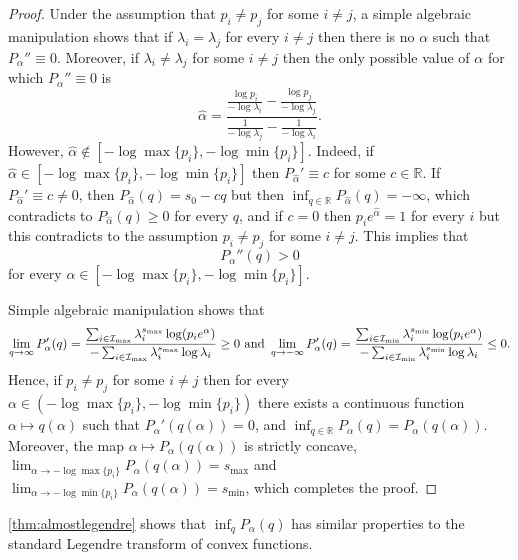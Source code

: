 \documentclass[12pt,]{article}
\theoremstyle{definition}
\theoremstyle{remark}
\renewcommand{\Bbb}[1]{\mathbb{#1}}
\newcommand{\bbR}{{\Bbb R}}        %
\newcommand{\cI}{{\cal I}}
\newcommand{\0}{\mathbf{0}}
\begin{document}
\begin{proof}
  Under the assumption that $p_i\neq p_j$ for some $i\neq j$, a simple algebraic manipulation shows
  that if $\lambda_i=\lambda_j$ for every $i\neq j$ then there is no $\alpha$ such that
  $P_\alpha''\equiv0$. Moreover, if  $\lambda_i\neq\lambda_j$ for some $i\neq j$ then the only
  possible value of $\alpha$ for which $P_\alpha''\equiv0$ is
  $$
  \widehat{\alpha}=\frac{\tfrac{\log p_i}{-\log\lambda_i}-\tfrac{\log
  p_j}{-\log\lambda_j}}{\tfrac{1}{-\log\lambda_j}-\tfrac{1}{-\log\lambda_i}}.
  $$
  However, $\widehat{\alpha}\notin [-\log\max\{p_i\},-\log\min\{p_i\}]$. Indeed, if
  $\widehat{\alpha}\in [-\log\max\{p_i\},-\log\min\{p_i\}]$ then $P_{\widehat{\alpha}}'\equiv c$ for
  some $c\in\bbR$. If $P_{\widehat{\alpha}}'\equiv c\neq0$, then $P_{\widehat{\alpha}}(q)=s_0-cq$
  but then $\inf_{q\in\bbR}P_{\widehat{\alpha}}(q)=-\infty$, which contradicts to
  $P_{\widehat{\alpha}}(q)\geq0$ for every $q$, and if $c=0$ then $p_ie^{\widehat{\alpha}}=1$ for
  every $i$ but this contradicts to the assumption $p_i\neq p_j$ for some $i\neq j$. This implies
  that
  $$
  P_\alpha''(q)>0
  $$
  for every $\alpha\in [-\log\max\{p_i\},-\log\min\{p_i\}]$.

  Simple algebraic manipulation shows that
  $$
  \lim_{q\to\infty}P_\alpha'(q)=\frac{\sum_{i\in\cI_{\max}}\lambda_i^{s_{\max}}\log(p_i
  e^{\alpha})}{-\sum_{i\in\cI_{\max}}\lambda_i^{s_{\max}}\log\lambda_i}\geq 0\text{ and
}\lim_{q\to-\infty}P_\alpha'(q)=\frac{\sum_{i\in\cI_{\min}}\lambda_i^{s_{\min}}\log(p_i
e^{\alpha})}{-\sum_{i\in\cI_{\min}}\lambda_i^{s_{\min}}\log\lambda_i}\leq 0.
  $$
  Hence, if $p_i\neq p_j$ for some $i\neq j$ then for every
  $\alpha\in(-\log\max\{p_i\},-\log\min\{p_i\})$ there exists a continuous function $\alpha\mapsto
  q(\alpha)$ such that $P_\alpha'(q(\alpha))=0$, and
  $\inf_{q\in\bbR}P_\alpha(q)=P_{\alpha}(q(\alpha))$. Moreover, the map $\alpha\mapsto
  P_{\alpha}(q(\alpha))$ is strictly concave,
  $\lim_{\alpha\to-\log\max\{p_i\}}P_{\alpha}(q(\alpha))=s_{\max}$ and
  $\lim_{\alpha\to-\log\min\{p_i\}}P_{\alpha}(q(\alpha))=s_{\min}$, which completes the proof.
\end{proof}

\cref{thm:almostlegendre} shows that $\inf_{q}P_\alpha(q)$ has similar properties to the standard
Legendre transform of convex functions.
\end{document}
